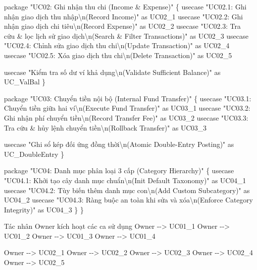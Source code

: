 \documentclass[11pt,a4paper]{article}
\newenvironment{Shaded}{}{}
\newcommand{\NormalTok}[1]{#1}
\begin{document}
\begin{Shaded}
\begin{Highlighting}[]
\NormalTok{    package "UC02: Ghi nhận thu chi (Income \& Expense)" \{}
\NormalTok{        usecase "UC02.1: Ghi nhận giao dịch thu nhập\textbackslash{}n(Record Income)" as UC02\_1}
\NormalTok{        usecase "UC02.2: Ghi nhận giao dịch chi tiêu\textbackslash{}n(Record Expense)" as UC02\_2}
\NormalTok{        usecase "UC02.3: Tra cứu \& lọc lịch sử giao dịch\textbackslash{}n(Search \& Filter Transactions)" as UC02\_3}
\NormalTok{        usecase "UC02.4: Chỉnh sửa giao dịch thu chi\textbackslash{}n(Update Transaction)" as UC02\_4}
\NormalTok{        usecase "UC02.5: Xóa giao dịch thu chi\textbackslash{}n(Delete Transaction)" as UC02\_5}
        
\NormalTok{        usecase "Kiểm tra số dư ví khả dụng\textbackslash{}n(Validate Sufficient Balance)" as UC\_ValBal}
\NormalTok{    \}}

\NormalTok{    package "UC03: Chuyển tiền nội bộ (Internal Fund Transfer)" \{}
\NormalTok{        usecase "UC03.1: Chuyển tiền giữa hai ví\textbackslash{}n(Execute Fund Transfer)" as UC03\_1}
\NormalTok{        usecase "UC03.2: Ghi nhận phí chuyển tiền\textbackslash{}n(Record Transfer Fee)" as UC03\_2}
\NormalTok{        usecase "UC03.3: Tra cứu \& hủy lệnh chuyển tiền\textbackslash{}n(Rollback Transfer)" as UC03\_3}
        
\NormalTok{        usecase "Ghi sổ kép đối ứng đồng thời\textbackslash{}n(Atomic Double{-}Entry Posting)" as UC\_DoubleEntry}
\NormalTok{    \}}

\NormalTok{    package "UC04: Danh mục phân loại 3 cấp (Category Hierarchy)" \{}
\NormalTok{        usecase "UC04.1: Khởi tạo cây danh mục chuẩn\textbackslash{}n(Init Default Taxonomy)" as UC04\_1}
\NormalTok{        usecase "UC04.2: Tùy biến thêm danh mục con\textbackslash{}n(Add Custom Subcategory)" as UC04\_2}
\NormalTok{        usecase "UC04.3: Ràng buộc an toàn khi sửa và xóa\textbackslash{}n(Enforce Category Integrity)" as UC04\_3}
\NormalTok{    \}}
\NormalTok{\}}

\NormalTok{\textquotesingle{} Tác nhân Owner kích hoạt các ca sử dụng}
\NormalTok{Owner {-}{-}\textgreater{} UC01\_1}
\NormalTok{Owner {-}{-}\textgreater{} UC01\_2}
\NormalTok{Owner {-}{-}\textgreater{} UC01\_3}
\NormalTok{Owner {-}{-}\textgreater{} UC01\_4}

\NormalTok{Owner {-}{-}\textgreater{} UC02\_1}
\NormalTok{Owner {-}{-}\textgreater{} UC02\_2}
\NormalTok{Owner {-}{-}\textgreater{} UC02\_3}
\NormalTok{Owner {-}{-}\textgreater{} UC02\_4}
\NormalTok{Owner {-}{-}\textgreater{} UC02\_5}


\end{Highlighting}
\end{Shaded}
\end{document}
